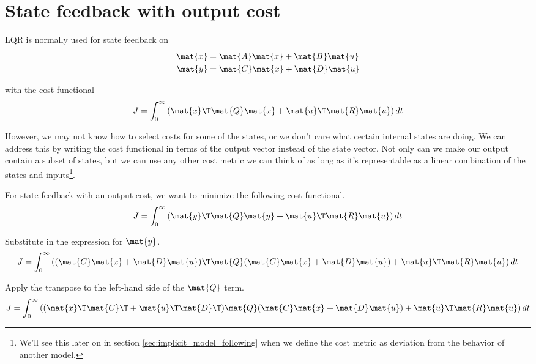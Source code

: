 \section{State feedback with output cost}

LQR is normally used for state feedback on
\begin{align*}
  \dot{\mat{x}} &= \mat{A}\mat{x} + \mat{B}\mat{u} \\
  \mat{y} &= \mat{C}\mat{x} + \mat{D}\mat{u}
\end{align*}

with the cost functional
\begin{equation*}
  J = \int_0^\infty \left(\mat{x}\T\mat{Q}\mat{x} +
    \mat{u}\T\mat{R}\mat{u}\right) dt
\end{equation*}

However, we may not know how to select costs for some of the states, or we don't
care what certain internal states are doing. We can address this by writing the
cost functional in terms of the output vector instead of the state vector. Not
only can we make our output contain a subset of states, but we can use any other
cost metric we can think of as long as it's representable as a linear
combination of the states and inputs\footnote{We'll see this later on in section
\ref{sec:implicit_model_following} when we define the cost metric as deviation
from the behavior of another model.}.

For state feedback with an output cost, we want to minimize the following cost
functional.
\begin{equation*}
  J = \int_0^\infty \left(\mat{y}\T\mat{Q}\mat{y} +
    \mat{u}\T\mat{R}\mat{u}\right) dt
\end{equation*}

Substitute in the expression for $\mat{y}$.
\begin{equation*}
  J = \int_0^\infty \left((\mat{C}\mat{x} + \mat{D}\mat{u})\T\mat{Q}
    (\mat{C}\mat{x} + \mat{D}\mat{u}) + \mat{u}\T\mat{R}\mat{u}\right) dt
\end{equation*}

Apply the transpose to the left-hand side of the $\mat{Q}$ term.
\begin{equation*}
  J = \int_0^\infty \left((\mat{x}\T\mat{C}\T + \mat{u}\T\mat{D}\T)\mat{Q}
    (\mat{C}\mat{x} + \mat{D}\mat{u}) + \mat{u}\T\mat{R}\mat{u}\right) dt
\end{equation*}

